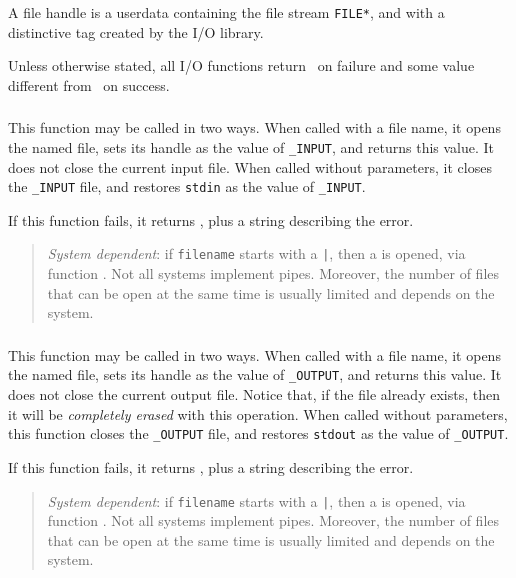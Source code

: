 A file handle is a userdata containing the file stream \verb|FILE*|,
and with a distinctive tag created by the I/O library.


Unless otherwise stated,
all I/O functions return \nil\ on failure and
some value different from \nil\ on success.

\subsubsection*{\ff {}}

This function may be called in two ways.
When called with a file name, it opens the named file,
sets its handle as the value of \verb|_INPUT|,
and returns this value.
It does not close the current input file.
When called without parameters,
it closes the \verb|_INPUT| file,
and restores \verb|stdin| as the value of \verb|_INPUT|.

If this function fails, it returns \nil,
plus a string describing the error.

\begin{quotation}
\noindent
\emph{System dependent}: if \verb|filename| starts with a \verb-|-,
then a  is opened, via function .
Not all systems implement pipes.
Moreover,
the number of files that can be open at the same time is
usually limited and depends on the system.
\end{quotation}

\subsubsection*{\ff {}}

This function may be called in two ways.
When called with a file name,
it opens the named file,
sets its handle as the value of \verb|_OUTPUT|,
and returns this value.
It does not close the current output file.
Notice that, if the file already exists,
then it will be \emph{completely erased} with this operation.
When called without parameters,
this function closes the \verb|_OUTPUT| file,
and restores \verb|stdout| as the value of \verb|_OUTPUT|.

If this function fails, it returns \nil,
plus a string describing the error.

\begin{quotation}
\noindent
\emph{System dependent}: if \verb|filename| starts with a \verb-|-,
then a  is opened, via function .
Not all systems implement pipes.
Moreover,
the number of files that can be open at the same time is
usually limited and depends on the system.
\end{quotation}

